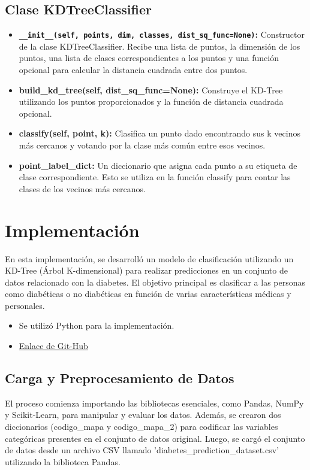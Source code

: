 \documentclass[]{article}
\begin{document}
\subsection{Clase KDTreeClassifier}
\begin{itemize}
	\item \textbf{\lstinline|__init__(self, points, dim, classes, dist_sq_func=None)|:} Constructor de la clase KDTreeClassifier. Recibe una lista de puntos, la dimensión de los puntos, una lista de clases correspondientes a los puntos y una función opcional para calcular la distancia cuadrada entre dos puntos.
	\item \textbf{build\_kd\_tree(self, dist\_sq\_func=None):} Construye el KD-Tree utilizando los puntos proporcionados y la función de distancia cuadrada opcional.
	\item \textbf{classify(self, point, k):} Clasifica un punto dado encontrando sus k vecinos más cercanos y votando por la clase más común entre esos vecinos.
	\item \textbf{point\_label\_dict:} Un diccionario que asigna cada punto a su etiqueta de clase correspondiente. Esto se utiliza en la función classify para contar las clases de los vecinos más cercanos.
\end{itemize}	
\section{Implementación}

En esta implementación, se desarrolló un modelo de clasificación utilizando un KD-Tree (Árbol K-dimensional) para realizar predicciones en un conjunto de datos relacionado con la diabetes. El objetivo principal es clasificar a las personas como diabéticas o no diabéticas en función de varias características médicas y personales.

\begin{itemize}
	\item Se utilizó Python para la implementación.
	\item \href{https://github.com/jhoel-choque/practica_1/tree/master}{Enlace de Git-Hub}
\end{itemize}


\subsection{Carga y Preprocesamiento de Datos}
El proceso comienza importando las bibliotecas esenciales, como Pandas, NumPy y Scikit-Learn, para manipular y evaluar los datos. Además, se crearon dos diccionarios (codigo\_mapa y codigo\_mapa\_2) para codificar las variables categóricas presentes en el conjunto de datos original. Luego, se cargó el conjunto de datos desde un archivo CSV llamado 'diabetes\_prediction\_dataset.csv' utilizando la biblioteca Pandas.
\end{document}
